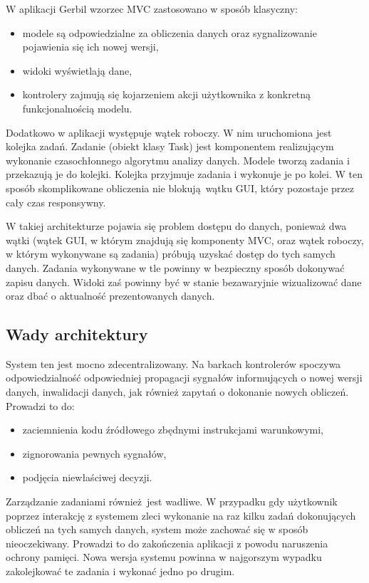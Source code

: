 W aplikacji Gerbil wzorzec MVC zastosowano w sposób klasyczny: 
\begin{itemize}
	\item modele są odpowiedzialne za obliczenia danych oraz sygnalizowanie pojawienia się ich nowej wersji,
	\item widoki wyświetlają dane,
	\item kontrolery zajmują się kojarzeniem akcji użytkownika z konkretną funkcjonalnością modelu.
\end{itemize}

Dodatkowo w aplikacji występuje wątek roboczy. W nim uruchomiona jest kolejka zadań. Zadanie (obiekt klasy Task) jest komponentem realizującym wykonanie czasochłonnego algorytmu analizy danych. Modele tworzą zadania i przekazują je do kolejki. Kolejka przyjmuje zadania i wykonuje je po kolei. W ten sposób skomplikowane obliczenia nie blokują wątku GUI, który pozostaje przez cały czas responsywny.

W takiej architekturze pojawia się problem dostępu do danych, ponieważ dwa wątki (wątek GUI, w którym znajdują się komponenty MVC, oraz wątek roboczy, w którym wykonywane są zadania) próbują uzyskać dostęp do tych samych danych. Zadania wykonywane w tle powinny w bezpieczny sposób dokonywać zapisu danych. Widoki zaś powinny być w stanie bezawaryjnie wizualizować dane oraz dbać o aktualność prezentowanych danych.

\subsection{Wady architektury}

System ten jest mocno zdecentralizowany. Na barkach kontrolerów spoczywa odpowiedzialność odpowiedniej propagacji sygnałów informujących o nowej wersji danych, inwalidacji danych, jak również zapytań o dokonanie nowych obliczeń. Prowadzi to do:
\begin{itemize}
	\item zaciemnienia kodu źródłowego zbędnymi instrukcjami warunkowymi,
	\item zignorowania pewnych sygnałów,
	\item podjęcia niewłaściwej decyzji.
\end{itemize}

Zarządzanie zadaniami również jest wadliwe. W przypadku gdy użytkownik poprzez interakcję z systemem zleci wykonanie na raz kilku zadań dokonujących obliczeń na tych samych danych, system może zachować się w sposób nieoczekiwany. Prowadzi to do zakończenia aplikacji z powodu naruszenia ochrony pamięci. Nowa wersja systemu powinna w najgorszym wypadku zakolejkować te zadania i wykonać jedno po drugim.

